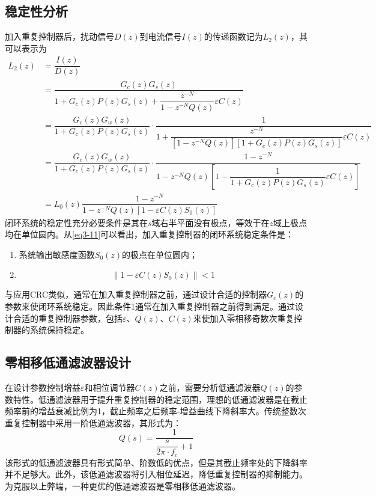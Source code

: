 \documentclass[
  lang=cn,
  degree=master,
  openany,oneside
]{nuaathesis}
\begin{document}
\subsection{稳定性分析}
加入重复控制器后，扰动信号$D(z)$到电流信号$I(z)$的传递函数记为$L_2(z)$，其可以表示为
\begin{equation}
\label{eq3-11}
\begin{aligned}
L_2(z)
&=\dfrac{I(z)}{D(z)}\\
&=\dfrac{G_c(z)G_s(z)}{1+G_c(z)P(z)G_s(z)+\dfrac{z^{-N}}{1-z^{-N}Q(z)}\varepsilon C(z)}\\
&=\dfrac{G_c(z)G_w(z)}{1+G_c(z)P(z)G_s(z)}\cdot \dfrac{1}{1+\dfrac{z^{-N}}{[1-z^{-N}Q(z)][1+G_c(z)P(z)G_s(z)]}\varepsilon C(z)}\\
&=\dfrac{G_c(z)G_w(z)}{1+G_c(z)P(z)G_s(z)}\cdot \dfrac{1-z^{-N}}{1-z^{-N}Q(z)\left[1-\dfrac{1}{1+G_c(z)P(z)G_s(z)}\varepsilon C(z)\right]}\\
&=L_0(z)\dfrac{1-z^{-N}}{1-z^{-N}Q(z)[1-\varepsilon C(z)S_0(z)]}
\end{aligned}
\end{equation}
闭环系统的稳定性充分必要条件是其在$s$域右半平面没有极点，等效于在$z$域上极点均在单位圆内。从\autoref{eq3-11}可以看出，加入重复控制器的闭环系统稳定条件是：
\begin{enumerate}
	\item 系统输出敏感度函数$S_0(z)$的极点在单位圆内；
	\item 
	\begin{equation}
		\label{eq_stable_odd}
		\left\|1 - \varepsilon C(z)S_0(z) \right\| < 1
	\end{equation}
\end{enumerate}
与应用CRC类似，通常在加入重复控制器之前，通过设计合适的控制器$G_c(z)$的参数来使闭环系统稳定。因此条件1通常在加入重复控制器之前得到满足。通过设计合适的重复控制器参数，包括$\varepsilon$、$Q(z)$、$C(z)$来使加入零相移奇数次重复控制器的系统保持稳定。
\subsection{零相移低通滤波器设计}
在设计参数控制增益$\varepsilon$和相位调节器$C(z)$之前，需要分析低通滤波器$Q(z)$的参数特性。低通滤波器用于提升重复控制器的稳定范围，理想的低通滤波器是在截止频率前的增益衰减比例为1，截止频率之后频率-增益曲线下降斜率大。传统整数次重复控制器中采用一阶低通滤波器，其形式为：
\begin{equation}
Q(s)=\dfrac{1}{\dfrac{s}{2\pi\cdot f_c}+1}
\end{equation}
该形式的低通滤波器具有形式简单、阶数低的优点，但是其截止频率处的下降斜率并不足够大。此外，该低通滤波器将引入相位延迟，降低重复控制器的抑制能力。为克服以上弊端，一种更优的低通滤波器是零相移低通滤波器。
\end{document}
